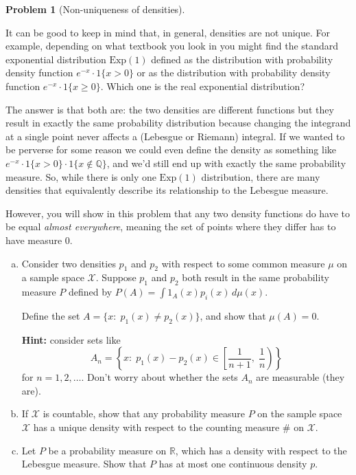 \documentclass{article}
\newcommand{\cX}{\mathcal{X}}
\newcommand{\QQ}{\mathbb{Q}}
\newcommand{\RR}{\mathbb{R}}
\theoremstyle{definition}
\newtheorem{problem}{Problem}
\begin{document}
\begin{problem}[Non-uniqueness of densities]
\label{prob:density-uniqueness}

It can be good to keep in mind that, in general, densities are not unique. For example, depending on what textbook you look in you might find the standard exponential distribution $\text{Exp}(1)$ defined as the distribution with probability density function ${e^{-x}\cdot 1\{x > 0\}}$ or as the distribution with probability density function $e^{-x}\cdot 1\{x \geq 0\}$. Which one is the real exponential distribution?

The answer is that both are: the two densities are different functions but they result in exactly the same probability distribution because changing the integrand at a single point never affects a (Lebesgue or Riemann) integral. If we wanted to be perverse for some reason we could even define the density as something like $e^{-x}\cdot 1\{x > 0\} \cdot 1\{x \notin \QQ\}$, and we'd still end up with exactly the same probability measure. So, while there is only one $\text{Exp}(1)$ distribution, there are many densities that equivalently describe its relationship to the Lebesgue measure.

However, you will show in this problem that any two density functions do have to be equal {\em almost everywhere}, meaning the set of points where they differ has to have measure $0$.

\begin{enumerate}[(a)]

\item 
Consider two densities $p_1$ and $p_2$ with respect to some common measure $\mu$ on a sample space $\cX$. Suppose $p_1$ and $p_2$ both result in the same probability measure $P$ defined by $P(A) = \int 1_A(x)p_i(x)\,d \mu(x)$.

Define the set $A = \{x:\; p_1(x) \neq p_2(x)\}$, and show that $\mu(A) = 0$.

{\bf Hint:} consider sets like 
\[A_{n} = \left\{x:\; p_1(x) - p_2(x) \in \left[\frac{1}{n+1}, \;\frac{1}{n}\right)\right\}\]
for $n=1,2,\ldots$. Don't worry about whether the sets $A_n$ are measurable (they are).

\item
If $\cX$ is countable, show that any probability measure $P$ on the sample space $\cX$ has a unique density with respect to the counting measure $\#$ on $\cX$.

\item
Let $P$ be a probability measure on $\RR$, which has a density with respect to the Lebesgue measure. Show that $P$ has at most one continuous density $p$.

\end{enumerate}

\end{problem}
\end{document}
